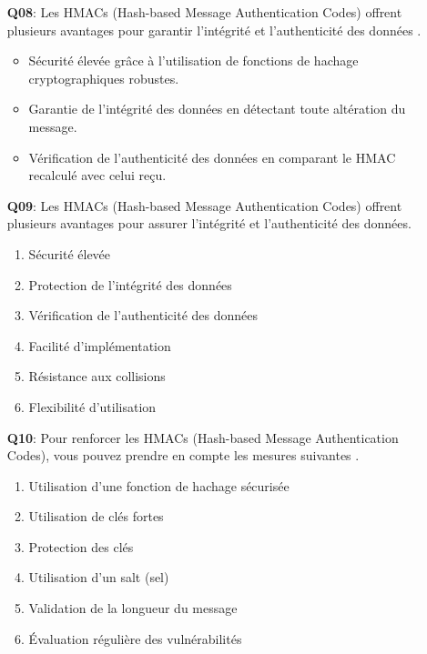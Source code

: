 \begin{enumerate}
    
    \item [\textbf{Q08}:] Les HMACs (Hash-based Message Authentication Codes) offrent plusieurs avantages pour garantir l'intégrité et l'authenticité des données .
    \begin{itemize}[label=$\cdot$]
        \item Sécurité élevée grâce à l'utilisation de fonctions de hachage cryptographiques robustes.
        \item Garantie de l'intégrité des données en détectant toute altération du message.
        \item Vérification de l'authenticité des données en comparant le HMAC recalculé avec celui reçu.
    \end{itemize}
    
    \item [\textbf{Q09}:] Les HMACs (Hash-based Message Authentication Codes) offrent plusieurs avantages pour assurer l'intégrité et l'authenticité des données.

    \begin{enumerate}
        \item Sécurité élevée
        \item Protection de l'intégrité des données
        \item Vérification de l'authenticité des données
        \item Facilité d'implémentation
        \item Résistance aux collisions
        \item Flexibilité d'utilisation
    \end{enumerate}
    
    \item [\textbf{Q10}:] Pour renforcer les HMACs (Hash-based Message Authentication Codes), vous pouvez prendre en compte les mesures suivantes .
    \begin{enumerate}
        \item Utilisation d'une fonction de hachage sécurisée
        \item Utilisation de clés fortes
        \item Protection des clés
        \item Utilisation d'un salt (sel)
        \item Validation de la longueur du message
        \item Évaluation régulière des vulnérabilités
    \end{enumerate}
    

\end{enumerate}
